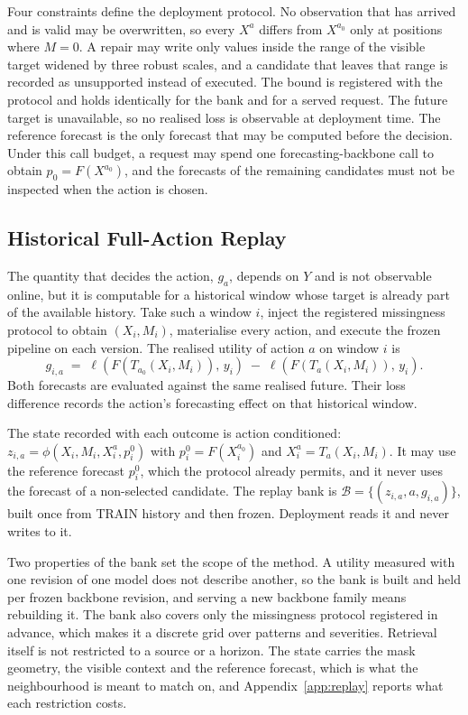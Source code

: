 \documentclass{article}
\newcommand{\calB}{\mathcal{B}}
\newcommand{\loss}{\ell}
\begin{document}
Four constraints define the deployment protocol. No observation that has arrived and is valid
may be overwritten, so every $X^{a}$ differs from $X^{a_0}$ only at positions where $M = 0$.
A repair may write only values inside the range of the visible target widened by three robust
scales, and a candidate that leaves that range is recorded as unsupported instead of executed.
The bound is registered with the protocol and holds identically for the bank and for a served
request. The future target is unavailable, so no realised loss is
observable at deployment time. The reference forecast is the only forecast that may be computed
before the decision. Under this call budget, a
request may spend one forecasting-backbone call to obtain $p_0 = F(X^{a_0})$, and the forecasts
of the remaining candidates must not be inspected when the action is chosen.

\subsection{Historical Full-Action Replay}
\label{sec:method-replay}
The quantity that decides the action, $g_a$, depends on $Y$ and is not observable online, but it
is computable for a historical window whose target is already part of the available history.
Take such a window $i$, inject the registered missingness protocol to obtain $(X_i, M_i)$,
materialise every action, and execute the frozen pipeline on each version. The realised utility
of action $a$ on window $i$ is
\begin{equation}
  g_{i,a} \;=\; \loss\!\left(F(T_{a_0}(X_i, M_i)),\, y_i\right)
  \;-\; \loss\!\left(F(T_{a}(X_i, M_i)),\, y_i\right).
  \label{eq:replay-gain}
\end{equation}
Both forecasts are evaluated against the same realised future. Their loss difference records
the action's forecasting effect on that historical window.

The state recorded with each outcome is action conditioned:
$z_{i,a} = \phi(X_i, M_i, X_i^{a}, p_i^{0})$ with $p_i^{0} = F(X_i^{a_0})$ and
$X_i^{a} = T_a(X_i, M_i)$.\label{eq:state} It may use the reference forecast $p_i^0$, which the
protocol already permits, and it never uses the forecast of a non-selected candidate. The
replay bank is $\calB = \{(z_{i,a}, a, g_{i,a})\}$, built once from TRAIN history and then
frozen. Deployment reads it and never writes to it.

Two properties of the bank set the scope of the method. A utility measured with one revision
of one model does not describe another, so the bank is built and held per frozen backbone
revision, and serving a new backbone family means rebuilding it. The bank also covers only the
missingness protocol registered in advance, which makes it a discrete grid over patterns and
severities. Retrieval itself is not restricted to a source
or a horizon. The state carries the mask geometry, the visible context and the reference
forecast, which is what the neighbourhood is meant to match on, and
Appendix~\ref{app:replay} reports what each restriction costs.
\end{document}
